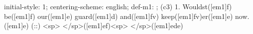 initial-style: 1;
centering-scheme: english;
def-m1: \grealign;
(c3) 1. Wouldst([em1]f) be([em1]f) our([em1]e) guard([em1]d) and([em1]fv) keep([em1]fv)er([em1]e) now.([em1]e) (::) <sp> </sp>([em1]ef)<sp> </sp>([em1]ede)